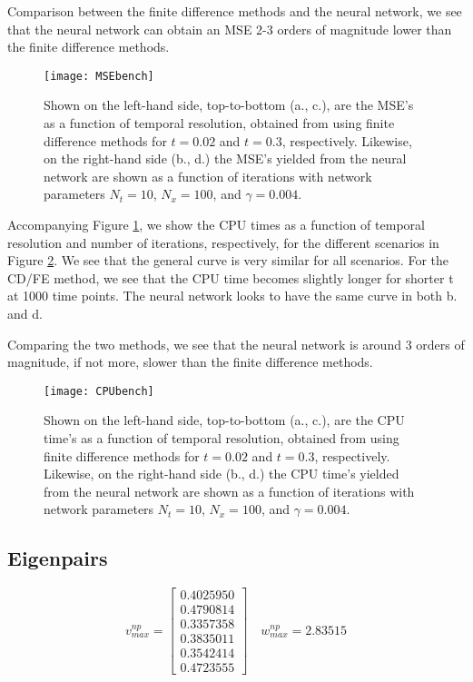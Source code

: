 Comparison between the finite difference methods and the neural network, we see that the neural network can obtain an MSE 2-3 orders of magnitude lower than the finite difference methods.
\begin{figure}[htbp]
 	\centering
 	\texttt{[image: MSEbench]}
  \caption{Shown on the left-hand side, top-to-bottom (a., c.), are the MSE's as a function of temporal resolution, obtained from using finite difference methods for $t=0.02$ and $t=0.3$, respectively. Likewise, on the right-hand side (b., d.) the MSE's yielded from the neural network are shown as a function of iterations with network parameters $N_t = 10$, $N_x = 100$, and $\gamma = 0.004$.}
  \label{fig:MSEbench}
\end{figure}

Accompanying Figure \ref{fig:MSEbench}, we show the CPU times as a function of temporal resolution and number of iterations, respectively, for the different scenarios in Figure \ref{fig:CPUbench}. We see that the general curve is very similar for all scenarios. For the CD/FE method, we see that the CPU time becomes slightly longer for shorter t at 1000 time points. The neural network looks to have the same curve in both b. and d.

Comparing the two methods, we see that the neural network is around 3 orders of magnitude, if not more, slower than the finite difference methods.
\begin{figure}[htbp]
 	\centering
 	\texttt{[image: CPUbench]}
 	\caption{Shown on the left-hand side, top-to-bottom (a., c.), are the CPU time's as a function of temporal resolution, obtained from using finite difference methods for $t=0.02$ and $t=0.3$, respectively. Likewise, on the right-hand side (b., d.) the CPU time's yielded from the neural network are shown as a function of iterations with network parameters $N_t = 10$, $N_x = 100$, and $\gamma = 0.004$.}
  \label{fig:CPUbench}
\end{figure}


\subsection{Eigenpairs}

\begin{equation*}
v_{max}^{np} = \begin{bmatrix}
	0.4025950 \\
	0.4790814 \\
	0.3357358 \\
    0.3835011 \\
    0.3542414 \\
    0.4723555
\end{bmatrix} \quad w_{max}^{np} =  2.83515
\end{equation*}

